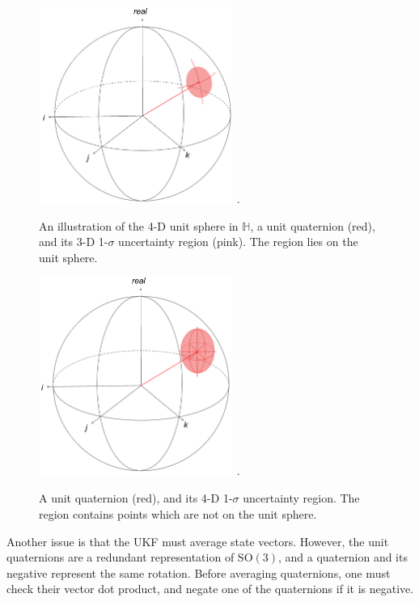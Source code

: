 \documentclass[conference]{IEEEtran}
\begin{document}
\begin{figure}[!t]
  \centering
  \includegraphics[width=2.5in]{figures/quat_uncert_3d.png}
  \DeclareGraphicsExtensions.
  \caption{An illustration of the 4-D unit sphere in $\mathbb{H}$, a unit quaternion (red), and its 3-D 1-$\sigma$ uncertainty region (pink). The region lies on the unit sphere.}
  \label{fig:quat_uncert_3d}
\end{figure}

\begin{figure}[!t]
  \centering
  \includegraphics[width=2.5in]{figures/quat_uncert_4d.png}
  \DeclareGraphicsExtensions.
  \caption{A unit quaternion (red), and its 4-D 1-$\sigma$ uncertainty region. The region contains points which are not on the unit sphere.}
  \label{fig:quat_uncert_4d}
\end{figure}

Another issue is that the UKF must average state vectors. However, the unit quaternions are a redundant representation of $\mathrm{SO(3)}$, and a quaternion and its negative represent the same rotation. Before averaging quaternions, one must check their vector dot product, and negate one of the quaternions if it is negative.\\
\end{document}
